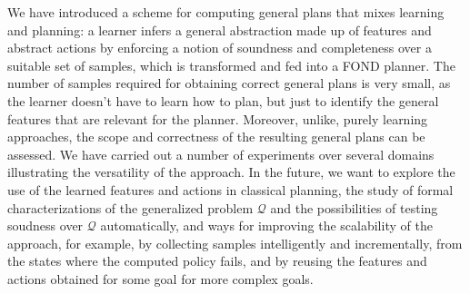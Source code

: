 \documentclass[letterpaper]{article} %
\newcommand{\Omit}[1]{}
\newcommand{\Q}{\mathcal{Q}}
\begin{document}
We have introduced a scheme for computing general plans that mixes learning and planning: a learner infers
a general abstraction made up of features and abstract actions by enforcing  a notion of soundness and completeness
over a suitable set of samples, which is transformed and fed into a FOND planner.
The number of samples required for obtaining correct general plans is very small,
as the learner doesn't have to learn how to plan,  but just to identify the
general features that are relevant for the planner. Moreover, unlike, purely
learning approaches, the scope and correctness of the resulting general plans
can be assessed.  We have carried out a number of experiments over several
domains illustrating the versatility of the approach. In the future, we
want to explore the use of the learned  features and actions
in classical planning, the study of  formal characterizations
of the generalized problem $\Q$ and  the possibilities
of testing soudness over $\Q$ automatically, and ways
for improving the scalability of the approach, for example,
by collecting samples intelligently and incrementally,
from the states where the computed  policy fails,
and by reusing the features and actions obtained
for some goal for more complex goals.

\Omit{


** discussion  of experiments; things we do well and not, scope, lessons. limitations (expressive? scalability?)

** briefly related work, expanding paragraph in intro.

** summary and cconlusions
}



\end{document}
